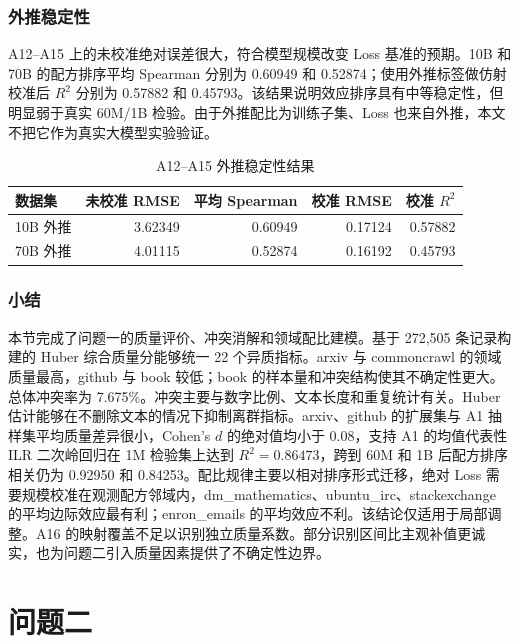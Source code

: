 \documentclass[bwprint]{gmcmthesis}
\begin{document}
        \subsubsection{外推稳定性}   %
        A12--A15 上的未校准绝对误差很大，符合模型规模改变 Loss 基准的预期。10B 和 70B 的配方排序平均 Spearman 分别为 0.60949 和 0.52874；使用外推标签做仿射校准后 $R^2$ 分别为 0.57882 和 0.45793。该结果说明效应排序具有中等稳定性，但明显弱于真实 60M/1B 检验。由于外推配比为训练子集、Loss 也来自外推，本文不把它作为真实大模型实验验证。
        
        \begin{table}[H]
        \centering
        \caption{A12--A15 外推稳定性结果}  %
        \label{tab:extrapolation}
        \begin{tabular}{lrrrr}
        \toprule
        数据集 & 未校准 RMSE & 平均 Spearman & 校准 RMSE & 校准 $R^2$ \\
        \midrule
        10B 外推 & 3.62349 & 0.60949 & 0.17124 & 0.57882 \\
        70B 外推 & 4.01115 & 0.52874 & 0.16192 & 0.45793 \\
        \bottomrule
        \end{tabular}
        \end{table}


        \subsubsection{小结}  %
        本节完成了问题一的质量评价、冲突消解和领域配比建模。基于 272,505 条记录构建的 Huber 综合质量分能够统一 22 个异质指标。arxiv 与 commoncrawl 的领域质量最高，github 与 book 较低；book 的样本量和冲突结构使其不确定性更大。总体冲突率为 7.675\%。冲突主要与数字比例、文本长度和重复统计有关。Huber 估计能够在不删除文本的情况下抑制离群指标。arxiv、github 的扩展集与 A1 抽样集平均质量差异很小，Cohen's $d$ 的绝对值均小于 0.08，支持 A1 的均值代表性ILR 二次岭回归在 1M 检验集上达到 $R^2=0.86473$，跨到 60M 和 1B 后配方排序相关仍为 0.92950 和 0.84253。配比规律主要以相对排序形式迁移，绝对 Loss 需要规模校准在观测配方邻域内，dm\_mathematics、ubuntu\_irc、stackexchange 的平均边际效应最有利；enron\_emails 的平均效应不利。该结论仅适用于局部调整。A16 的映射覆盖不足以识别独立质量系数。部分识别区间比主观补值更诚实，也为问题二引入质量因素提供了不确定性边界。


\section{问题二}   %
\end{document}
